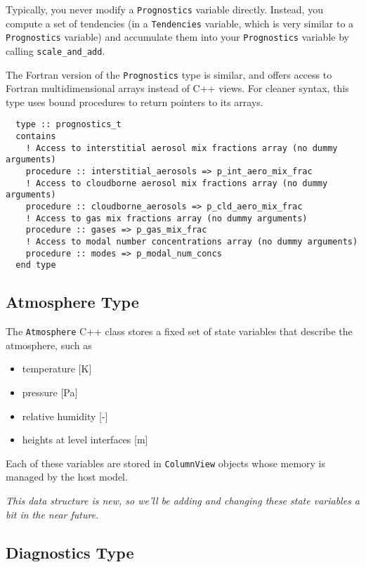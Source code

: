 Typically, you never modify a \texttt{Prognostics} variable directly. Instead, you
compute a set of tendencies (in a \texttt{Tendencies} variable, which is very
similar to a \texttt{Prognostics} variable) and accumulate them into your
\texttt{Prognostics} variable by calling \texttt{scale\_and\_add}.

The Fortran version of the \texttt{Prognostics} type is similar, and offers
access to Fortran multidimensional arrays instead of C++ views. For cleaner
syntax, this type uses bound procedures to return pointers to its arrays.

\begin{lstlisting}
  type :: prognostics_t
  contains
    ! Access to interstitial aerosol mix fractions array (no dummy arguments)
    procedure :: interstitial_aerosols => p_int_aero_mix_frac
    ! Access to cloudborne aerosol mix fractions array (no dummy arguments)
    procedure :: cloudborne_aerosols => p_cld_aero_mix_frac
    ! Access to gas mix fractions array (no dummy arguments)
    procedure :: gases => p_gas_mix_frac
    ! Access to modal number concentrations array (no dummy arguments)
    procedure :: modes => p_modal_num_concs
  end type
\end{lstlisting}

\subsection{Atmosphere Type}

The \texttt{Atmosphere} C++ class stores a fixed set of state variables that
describe the atmosphere, such as

\begin{itemize}
  \item temperature [K]
  \item pressure [Pa]
  \item relative humidity [-]
  \item heights at level interfaces [m]
\end{itemize}

Each of these variables are stored in \texttt{ColumnView} objects whose memory
is managed by the host model.

{\em This data structure is new, so we'll be adding and changing these state
variables a bit in the near future.}

\subsection{Diagnostics Type}

